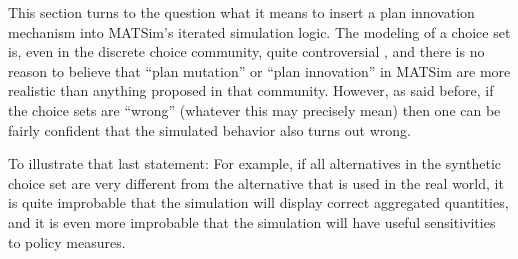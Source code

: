 
This section turns to the question what it means to insert a plan
innovation mechanism into MATSim's iterated simulation logic. The
modeling of a choice set is, even in the discrete choice community,
quite controversial \citep{frejinger-2010}, and there is no reason
to believe that {}``plan mutation'' or {}``plan innovation'' in
MATSim are more realistic than anything proposed in that community.
However, as said before, if the choice sets are {}``wrong'' (whatever
this may precisely mean) then one can be fairly confident that the
simulated behavior also turns out wrong.

 To illustrate that last statement:
%
For example, if all alternatives in the synthetic choice set are very different from the alternative that is used in the real world, it is quite improbable that the simulation will display correct aggregated quantities, and it is even more improbable that the simulation will have useful sensitivities to policy measures.



